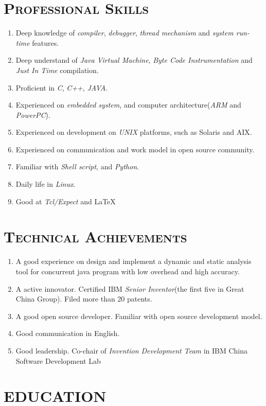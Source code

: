 \begin{resume}
\section{\textsc{Professional Skills}}
\begin{enumerate} 
\item[] Deep knowledge of \emph{compiler}, \emph{debugger}, \emph{thread mechanism} and \emph{system run-time} features.
\item[] Deep understand of \emph{Java Virtual Machine}, \emph{Byte Code Instrumentation} and \emph{Just In Time} compilation.
\item[] Proficient in \emph{C}, \emph{C++}, \emph{JAVA}.
\item[] Experienced on \emph{embedded system}, and computer architecture(\emph{ARM} and \emph{PowerPC}).
\item[] Experienced on development on \emph{UNIX} platforms, such as Solaris and AIX.
\item[] Experienced on communication and work model in open source community.
\item[] Familiar with \emph{Shell script}, and \emph{Python}.
\item[] Daily life in \emph{Linux}.
\item[] Good at \emph{Tcl/Expect} and 
 \LaTeX
\end{enumerate}

\section{\textsc{Technical Achievements}}
\begin{enumerate}
\item[] A good experience on design and implement a dynamic and static analysis tool for concurrent java program with low overhead and high accuracy.
\item[] A active innovator.  Certified IBM \emph{Senior Inventor}(the first five in Great China Group).  Filed more than 20 patents.
\item[] A good open source developer.  Familiar with open source development model.
\item[] Good communication in English.
\item[] Good leadership.  Co-chair of \emph{Invention Development Team} in IBM China Software Development Lab
\end{enumerate}

\section{\textsc{EDUCATION}}


\end{resume}
